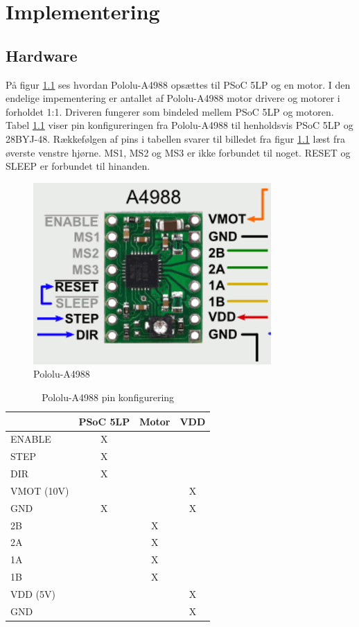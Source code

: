 \chapter{Implementering}
\section{Hardware}
\label{HW_Implementering}
På figur \ref{fig:Pololu-A4988} ses hvordan Pololu-A4988 opsættes til PSoC 5LP og en motor. I den endelige impementering er antallet af Pololu-A4988 motor drivere og motorer i forholdet 1:1. Driveren fungerer som bindeled mellem PSoC 5LP og motoren. Tabel \ref{tab:Pololu-A4988_pin_configuration} viser pin konfigureringen fra Pololu-A4988 til henholdsvis PSoC 5LP og 28BYJ-48. Rækkefølgen af pins i tabellen svarer til billedet fra figur \ref{fig:Pololu-A4988} læst fra øverste venstre hjørne. MS1, MS2 og MS3 er ikke forbundet til noget. RESET og SLEEP er forbundet til hinanden.

\begin{figure}[H]
	\centerline{\includegraphics[scale=0.6]{Pololu-A4988.png}}
	\caption[]{Pololu-A4988}\footnotemark
	\label{fig:Pololu-A4988}
\end{figure}

\begin{table}[H]
  \centering
\begin{tabular}{ |l|c|c|c| }
  \hline
   & \textbf{PSoC 5LP} & \textbf{Motor} & \textbf{VDD} \\
  \hline 
  ENABLE & X & & \\
  \hline
  STEP & X & & \\
  \hline
  DIR & X & & \\
  \hline
  VMOT (10V) & & & X \\
  \hline
  GND & X & & X \\
  \hline
  2B & & X & \\
  \hline
  2A & & X & \\
  \hline
  1A & & X & \\
  \hline
  1B & & X & \\
  \hline
  VDD (5V) & & & X \\
  \hline
  GND & & & X \\
  \hline
\end{tabular}
\caption{Pololu-A4988 pin konfigurering}\label{tab:Pololu-A4988_pin_configuration}
\end{table}


